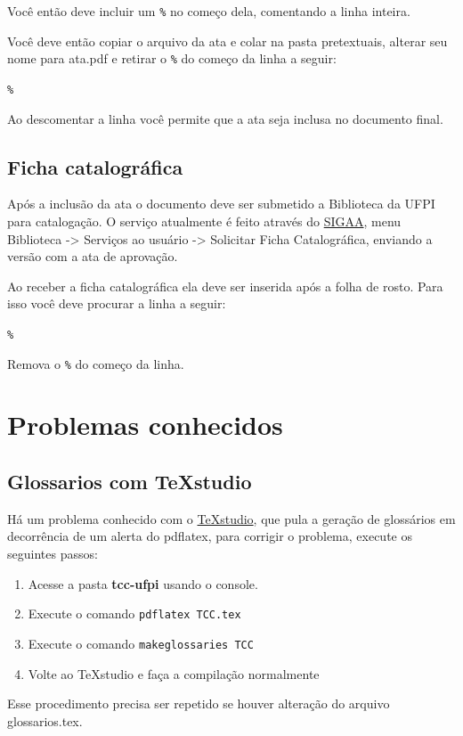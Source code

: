 Você então deve incluir um \verb|%| no começo dela, comentando a linha inteira.

Você deve então copiar o arquivo da ata e colar na pasta pretextuais, alterar seu nome para ata.pdf e retirar o \verb|%| do começo da linha a seguir:  
\par\verb|% | \par
Ao descomentar a linha você permite que a ata seja inclusa no documento final. 

\subsection{Ficha catalográfica}

Após a inclusão da ata o documento deve ser submetido a Biblioteca da UFPI para catalogação. O serviço atualmente é feito através do \href{http://sigaa.ufpi.br}{SIGAA}, menu Biblioteca -> Serviços ao usuário -> Solicitar Ficha Catalográfica, enviando a versão com a ata de aprovação. 

Ao receber a ficha catalográfica ela deve ser inserida após a folha de rosto. Para isso você deve procurar a linha a seguir: 
\par\verb|% | \par
Remova o \verb|%| do começo da linha. 

\section{Problemas conhecidos}

\subsection{Glossarios com TeXstudio}
Há um problema conhecido com o \href{https://www.texstudio.org/}{TeXstudio}, que pula a geração de glossários em decorrência de um alerta do pdflatex, para corrigir o problema, execute os seguintes passos:

\begin{enumerate}
	\item Acesse a pasta \textbf{tcc-ufpi} usando o console.
	\item Execute o comando \verb|pdflatex TCC.tex|
	\item Execute o comando \verb|makeglossaries TCC|
	\item Volte ao TeXstudio e faça a compilação normalmente 
\end{enumerate}

Esse procedimento precisa ser repetido se houver alteração do arquivo glossarios.tex.


